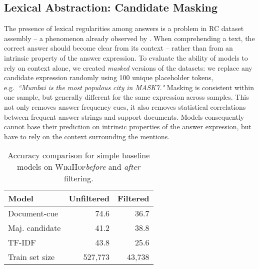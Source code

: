 \documentclass[11pt,letterpaper]{article}
\newcommand{\WikiHop}{\textsc{WikiHop}\xspace}
\begin{document}
\subsection{Lexical Abstraction: Candidate Masking}
\label{sec:masking}
The presence of lexical regularities among answers is a problem in RC dataset assembly -- a phenomenon already observed by .
When comprehending a text, the correct answer should become clear from its context -- rather than from an intrinsic property of the answer expression.
To evaluate the ability of models to rely on context alone, we created \emph{masked} versions of the datasets: we replace any candidate expression randomly using 100 unique placeholder tokens, e.g.\ \emph{``Mumbai is the most populous city in \textsc{MASK7}."}
Masking is consistent within one sample, but generally different for the same expression across samples. This not only removes answer frequency cues, it also removes statistical correlations between frequent answer strings and support documents.
Models consequently cannot base their prediction on intrinsic properties of the answer expression, but have to rely on the context surrounding the mentions.


\begin{table}[t]
    \begin{center}
        \begin{tabular}{lrr}
            Model               & Unfiltered    &  Filtered         \\
            \toprule
            Document-cue        & 74.6        & 36.7           \\
            Maj. candidate      & 41.2        & 38.8           \\
            TF-IDF              & 43.8        & 25.6           \\
            \midrule
            Train set size      & 527,773     & 43,738              
        \end{tabular}
    \end{center}
    \caption{
        Accuracy comparison for simple baseline models on \WikiHop \emph{before} and \emph{after} filtering.
}
    \label{tab:wh3_subsampling_effect}
\end{table}
\end{document}
